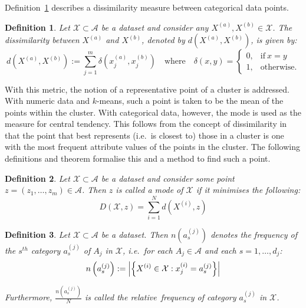\documentclass[11pt]{article}
\newtheorem{definition}{Definition}
\DeclarePairedDelimiter\abs{\lvert}{\rvert}%
\begin{document}
Definition~\ref{def:dissim} describes a dissimilarity measure between
categorical data points.

\begin{definition}\label{def:dissim}
    Let \(\mathcal{X} \subset \mathcal A\) be a dataset and consider any
    \(X^{(a)}, X^{(b)} \in \mathcal{X}\). The dissimilarity between \(X^{(a)}\)
    and \(X^{(b)}\), denoted by \(d\left(X^{(a)}, X^{(b)}\right)\), is given by:
    \begin{equation}\label{eq:dissim}
        d\left(X^{(a)}, X^{(b)}\right) := \sum_{j=1}^{m} \delta\left(x_j^{(a)},
        x_j^{(b)}\right) \quad \text{where} \quad \delta\left(x, y\right) =
        \begin{cases}
            0, & \text{if} \ x = y \\
            1, & \text{otherwise.}
        \end{cases}
    \end{equation}
\end{definition}

With this metric, the notion of a representative point of a cluster is
addressed. With numeric data and \(k\)-means, such a point is taken to be the
mean of the points within the cluster. With categorical data, however, the mode
is used as the measure for central tendency. This follows from the concept of
dissimilarity in that the point that best represents (i.e.\ is closest to) those
in a cluster is one with the most frequent attribute values of the points in the
cluster. The following definitions and theorem formalise this and a method to
find such a point.

\begin{definition}\label{def:mode}
    Let \(\mathcal{X} \subset \mathcal{A}\) be a dataset and consider some point
    \(z = \left(z_1, \ldots, z_m\right) \in \mathcal{A}\). Then \(z\) is called
    a \emph{mode} of \(\mathcal{X}\) if it minimises the following:
    \begin{equation}\label{eq:summed-dissim}
        D\left(\mathcal{X}, z\right) = \sum_{i=1}^{N} d\left(X^{(i)}, z\right)
    \end{equation}
\end{definition}

\begin{definition}\label{def:rel-freq}
    Let \(\mathcal{X} \subset \mathcal{A}\) be a dataset. Then
    \(n\left(a_s^{(j)}\right)\) denotes the \emph{frequency} of the \(s^{th}\)
    category \(a_s^{(j)}\) of \(A_j\) in \(\mathcal{X}\), i.e.\ for each \(A_j
    \in \mathcal{A}\) and each \(s = 1, \ldots, d_j\):
    \begin{equation}
        n\left(a_s^{(j)}\right) := \abs*{%
            {\left\{X^{(i)} \in \mathcal{X}: x_j^{(i)} = a_s^{(j)}\right\}}
        }
    \end{equation}
	
    Furthermore, \(\frac{n\left(a_s^{(j)}\right)}{N}\) is called the
    \emph{relative~frequency} of category \(a_s^{(j)}\) in \(\mathcal{X}\).
\end{definition}
\end{document}

